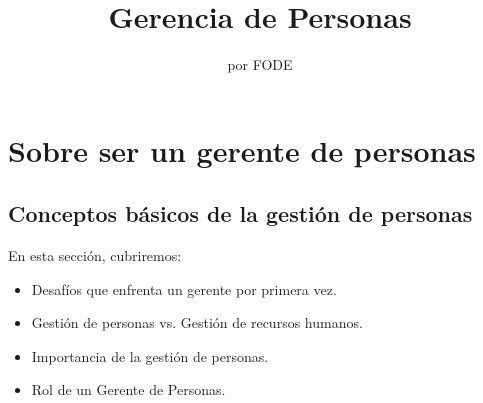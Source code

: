 \documentclass[10pt]{book}
\begin{document}
\normalfont

\author{\Large por FODE}
\title{Gerencia de Personas}
\date{}
\pagestyle{empty}
\maketitle
\thispagestyle{empty}
\let\cleardoublepage\clearpage
\tableofcontents 								%

 
\let\cleardoublepage\clearpage

\chapter{Sobre ser un gerente de personas}
\section{Conceptos básicos de la gestión de personas}
En esta sección, cubriremos:
\begin{itemize}
\item Desafíos que enfrenta un gerente por primera vez.
\item Gestión de personas vs. Gestión de recursos humanos.
\item Importancia de la gestión de personas.
\item Rol de un Gerente de Personas.
\end{itemize}
\end{document}
